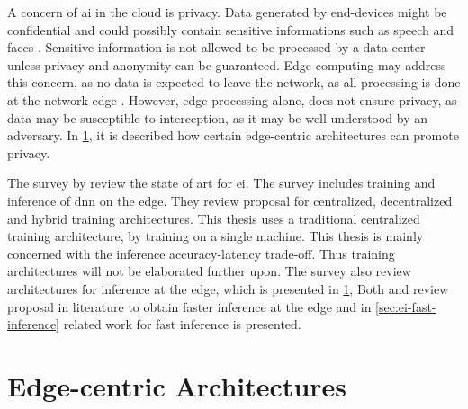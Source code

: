 A concern of \gls{ai} in the cloud is privacy. Data generated by end-devices might be confidential and could possibly contain sensitive informations such as speech and faces \cite{chen_deep_2019}. Sensitive information is not allowed to be processed by a data center unless privacy and anonymity can be guaranteed. Edge computing may address this concern, as no data is expected to leave the network, as all processing is done at the network edge \cite{chen_deep_2019}. However, edge processing alone, does not ensure privacy, as data may be susceptible to interception, as it may be well understood by an adversary. In \ref{sec:ei-architecture}, it is described how certain edge-centric architectures can promote privacy. 
 
The survey  by \citet{zhou_edge_2019} review the state of art for \gls{ei}. The survey includes training and inference of \gls{dnn} on the edge. They review proposal for centralized, decentralized and hybrid training architectures. This thesis uses a traditional centralized training architecture, by training on a single machine. This thesis is mainly concerned with the inference accuracy-latency trade-off. Thus training architectures will not be elaborated further upon. The survey also review architectures for inference at the edge, which is presented in \ref{sec:ei-architecture},  Both \cite{zhou_edge_2019} and \cite{chen_deep_2019} review proposal in literature to obtain faster inference at the edge and in \ref{sec:ei-fast-inference} related work for fast inference is presented. 

\newpage
\section{Edge-centric Architectures} \label{sec:ei-architecture}

